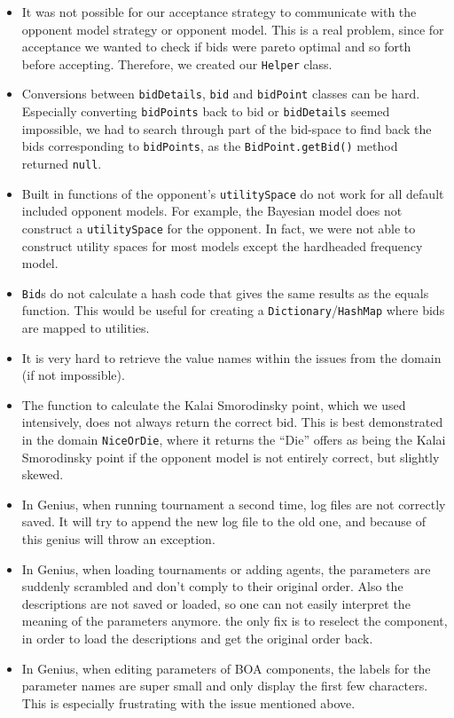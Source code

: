 \begin{itemize}
\item It was not possible for our acceptance strategy to communicate with the 
opponent model strategy or opponent model. This is a real problem, 
since for acceptance we wanted to check if bids were pareto optimal and so forth
before accepting. Therefore, we created our \texttt{Helper} class.
\item Conversions between \verb-bidDetails-, \verb-bid- and \verb-bidPoint- classes can be hard. Especially 
converting \verb-bidPoints- back to bid or \verb-bidDetails- seemed impossible, we had to search through
part of the bid-space to find back the bids corresponding to \verb-bidPoints-, as the \texttt{BidPoint.getBid()} method returned \texttt{null}.
\item Built in functions of the opponent's \verb-utilitySpace- do not work for all default included 
opponent models. For example, the Bayesian model does not construct a \verb-utilitySpace- for the opponent. 
In fact, we were not able to construct utility spaces for most models except the hardheaded frequency model. 
\item \verb-Bid-s do not calculate a hash code that gives the same results as the equals function. This would 
be useful for creating a \verb-Dictionary-/\verb-HashMap- where bids are mapped to utilities.
\item It is very hard to retrieve the value names within the issues from the domain (if not impossible).
\item The function to calculate the Kalai Smorodinsky point, which we used intensively,
does not always return the correct bid. This is best demonstrated in the domain 
\verb-NiceOrDie-, where it returns the ``Die'' offers as being the Kalai Smorodinsky point if the opponent model
is not entirely correct, but slightly skewed.
\item In Genius, when running tournament a second time, log files are not correctly saved.
It will try to append the new log file to the old one, and because of this genius will throw
an exception. 
\item In Genius, when loading tournaments or adding agents, the parameters are suddenly scrambled and don't comply to their original order. Also the descriptions are not saved or loaded, so one can not easily interpret the meaning of the parameters anymore. the only fix is to reselect the component, in order to load the descriptions and get the original order back.
\item In Genius, when editing parameters of BOA components, the labels for the parameter names are super small and only display the first few characters. This is especially frustrating with the issue mentioned above.

\end{itemize}
